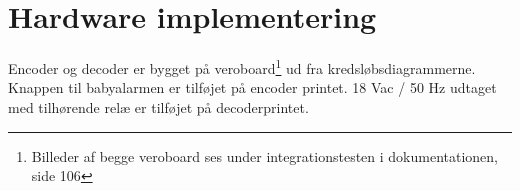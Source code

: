 \section{Hardware implementering}


Encoder og decoder er bygget på veroboard\footnote{Billeder af begge veroboard ses under integrationstesten i dokumentationen, side 106} ud fra kredsløbsdiagrammerne. Knappen til babyalarmen er tilføjet på encoder printet. 18 Vac / 50 Hz udtaget med tilhørende relæ er tilføjet på decoderprintet. 